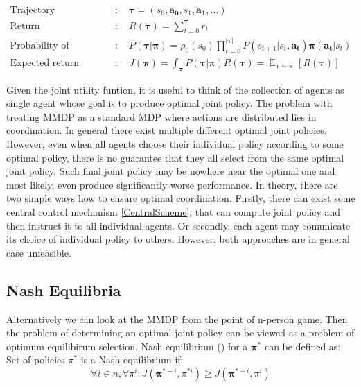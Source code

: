 \begin{align*}    
        \textrm{Trajectory}&: \quad \boldsymbol{\tau} = (s_0, \boldsymbol{a_0}, s_1, \boldsymbol{a_1}, ...) \\
        \textrm{Return}&: \quad R(\boldsymbol{\tau}) = \sum_{t=0}^{\boldsymbol{\tau}}r_t  \\
        \textrm{Probability of trajectory}&: \quad P(\boldsymbol{\tau}|\boldsymbol{\pi}) = \rho_0(s_0) \prod_{t=0}^{|\boldsymbol{\tau}|} P(s_{t+1}|s_t,\boldsymbol{a_t})\boldsymbol{\pi}(\boldsymbol{a_t}|s_t) \\
        \textrm{Expected return}&: \quad J(\boldsymbol{\pi})=\int_{\boldsymbol{\tau}} P(\boldsymbol{\tau}|\boldsymbol{\pi})R(\boldsymbol{\tau})= \mathop{\mathbb{E}}_{\boldsymbol{\tau} \sim \boldsymbol{\pi}}[R(\boldsymbol{\tau})]
\end{align*}


Given the joint utility funtion, it is useful to think of the collection of agents as single agent whose goal is to produce optimal joint policy.
The problem with treating MMDP as a standard MDP where actions are distributed lies in coordination.
In general there exist multiple different optimal joint policies.
However, even when all agents choose their individual policy according to some optimal policy, there is no guarantee that they all select from the same optimal joint policy.
Such final joint policy may be nowhere near the optimal one and most likely, even produce significantly worse performance.
In theory, there are two simple ways how to ensure optimal coordination.
Firstly, there can exist some central control mechanism \ref{CentralScheme}, that can compute joint policy and then instruct it to all individual agents.
Or secondly, each agent may comunicate its choice of individual policy to others.
However, both approaches are in general case unfeasible.

\subsection{Nash Equilibria}
Alternatively we can look at the MMDP from the point of n-person game. 
Then the problem of determining an optimal joint policy can be viewed as a problem of optimum equilibirum selection.
Nash equilibrium (\cite{NASH}) for a $\boldsymbol{\pi}^*$ can be defined as:\linebreak
Set of policies $\pi^*$ is a Nash equilibrium if:
\[
    \forall i \in n, \forall \pi^i: J(\boldsymbol{\pi}^{*-i}, \pi^{*i}) \ge J(\boldsymbol{\pi}^{*-i}, \pi^i)
\]

